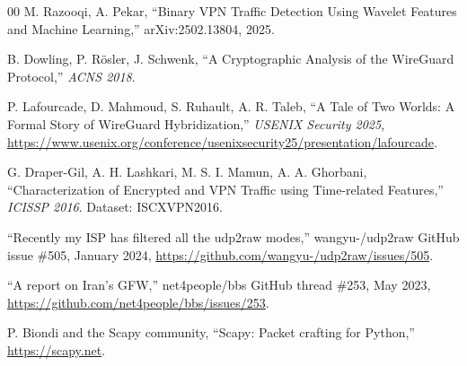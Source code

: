 \documentclass[conference]{IEEEtran}
\begin{document}
\begin{thebibliography}{00}
 M. Razooqi, A. Pekar, ``Binary VPN Traffic
Detection Using Wavelet Features and Machine Learning,'' arXiv:2502.13804,
2025.

 B. Dowling, P. Rösler, J. Schwenk,
``A Cryptographic Analysis of the WireGuard Protocol,'' \textit{ACNS 2018}.

 P. Lafourcade, D. Mahmoud, S. Ruhault,
A. R. Taleb, ``A Tale of Two Worlds: A Formal Story of WireGuard
Hybridization,'' \textit{USENIX Security 2025},
\url{https://www.usenix.org/conference/usenixsecurity25/presentation/lafourcade}.

 G. Draper-Gil, A. H. Lashkari, M. S. I. Mamun,
A. A. Ghorbani, ``Characterization of Encrypted and VPN Traffic using
Time-related Features,'' \textit{ICISSP 2016}. Dataset: ISCXVPN2016.

 ``Recently my ISP has filtered all the
udp2raw modes,'' wangyu-/udp2raw GitHub issue \#505, January 2024,
\url{https://github.com/wangyu-/udp2raw/issues/505}.

 ``A report on Iran's GFW,''
net4people/bbs GitHub thread \#253, May 2023,
\url{https://github.com/net4people/bbs/issues/253}.

 P. Biondi and the Scapy community, ``Scapy: Packet
crafting for Python,'' \url{https://scapy.net}.
\end{thebibliography}
\end{document}
